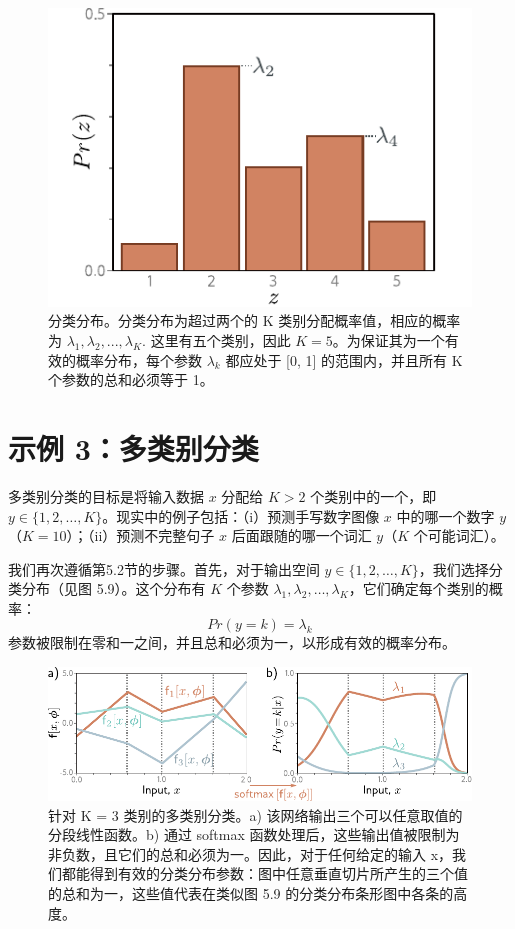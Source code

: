 \documentclass[lang=cn,newtx,10pt,scheme=chinese]{elegantbook}
\begin{document}
\begin{figure}[ht!]
	\centering
	\includegraphics[width=0.7\linewidth]{PDFFigures/UDLChap5PDF/LossCategorical.pdf}
	\caption{分类分布。分类分布为超过两个的 K 类别分配概率值，相应的概率为 \(\lambda_1,\lambda_2,...,\lambda_K\). 这里有五个类别，因此 \(K = 5\)。为保证其为一个有效的概率分布，每个参数 \(\lambda_k\) 都应处于 [0, 1] 的范围内，并且所有 K 个参数的总和必须等于 1。}
\end{figure}


\section{示例 3：多类别分类}

多类别分类的目标是将输入数据 \(x\) 分配给 \(K > 2\) 个类别中的一个，即 \(y \in \{1, 2, \ldots, K\}\)。现实中的例子包括：（i）预测手写数字图像 \(x\) 中的哪一个数字 \(y\)（\(K = 10\)）；（ii）预测不完整句子 \(x\) 后面跟随的哪一个词汇 \(y\)（\(K\) 个可能词汇）。

我们再次遵循第5.2节的步骤。首先，对于输出空间 \(y \in \{1, 2, \ldots, K\}\)，我们选择分类分布（见图 5.9）。这个分布有 \(K\) 个参数 \(\lambda_1, \lambda_2, \ldots, \lambda_K\)，它们确定每个类别的概率：
\begin{equation}
Pr(y = k) = \lambda_k 
\end{equation}
参数被限制在零和一之间，并且总和必须为一，以形成有效的概率分布。

\begin{figure}[ht!]
	\centering
	\includegraphics[width=0.7\linewidth]{PDFFigures/UDLChap5PDF/LossMultiClassClassification.pdf}
	\caption{针对 K = 3 类别的多类别分类。a) 该网络输出三个可以任意取值的分段线性函数。b) 通过 softmax 函数处理后，这些输出值被限制为非负数，且它们的总和必须为一。因此，对于任何给定的输入 x，我们都能得到有效的分类分布参数：图中任意垂直切片所产生的三个值的总和为一，这些值代表在类似图 5.9 的分类分布条形图中各条的高度。}
\end{figure}
\end{document}
